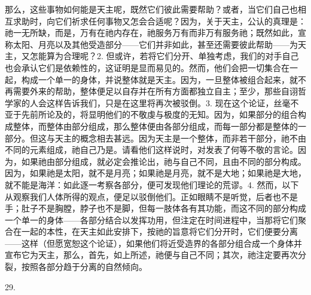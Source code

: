 那么，这些事物如何能是天主呢，既然它们彼此需要帮助？或者，当它们自己也相互求助时，向它们祈求任何事物又怎会合适呢？因为，关于天主，公认的真理是：祂一无所缺，而是，万有在祂内存在，祂服务万有而非万有服务祂；既然如此，宣称太阳、月亮以及其他受造部分——它们并非如此，甚至还需要彼此帮助——为天主，又怎能算为合理呢？2. 但或许，若将它们分开、单独考虑，我们的对手自己也会承认它们是依赖性的，这证明是显而易见的。然而，他们会把一切集合在一起，构成一个单一的身体，并说整体就是天主。因为，一旦整体被组合起来，就不再需要外来的帮助，整体便足以自存并在所有方面都独立自主；至少，那些自诩哲学家的人会这样告诉我们，只是在这里将再次被驳倒。3. 现在这个论证，丝毫不亚于先前所论及的，将显明他们的不敬虔与极度的无知。因为，如果部分的组合构成整体，而整体由部分组成，那么整体便由各部分组成，而每一部分都是整体的一部分。但这与天主的概念相去甚远。因为天主是一个整体，而非若干部分，祂不由不同的元素组成，祂自己乃是。请看他们这样说时，对发表了何等不敬的言论。因为，如果祂由部分组成，就必定会推论出，祂与自己不同，且由不同的部分构成。因为，如果祂是太阳，就不是月亮；如果祂是月亮，就不是大地；如果祂是大地，就不能是海洋：如此逐一考察各部分，便可发现他们理论的荒谬。4. 然而，以下从观察我们人体所得的观点，便足以驳倒他们。正如眼睛不是听觉，后者也不是手；肚子不是胸膛，脖子也不是脚，但每一肢体各有其功能，而这不同的部分构成一个单一的身体——各部分结合以发挥功用，但注定在时间进程中，当那将它们聚合在一起的本性，在天主如此安排下，按祂的旨意将它们分开时，它们便要分离——这样（但愿宽恕这个论证），如果他们将近受造界的各部分组合成一个身体并宣布它为天主，那么，首先，如上所述，祂便与自己不同；其次，祂注定要再次分裂，按照各部分趋于分离的自然倾向。\par

29. \par

